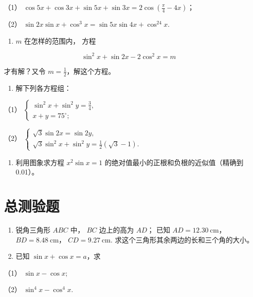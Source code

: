 （1）
\(\cos 5x + \cos 3x + \sin 5x + \sin 3x = 2\cos \left(\frac{\pi}{4} - 4x\right)\)；

（2） \(\sin 2x\sin x + \cos^3 x = \sin 5x\sin 4x + \cos^24x.\)

\begin{enumerate}[start=67]
\item
  \(m\) 在怎样的范围内， 方程
\end{enumerate}

\[
\sin^ {2} x + \sin 2 x - 2 \cos^ {2} x = m
\]

才有解？又令 \(m = \frac{1}{2}\)，解这个方程。

\begin{enumerate}[start=68]
\item
  解下列各方程组：
\end{enumerate}

（1）
\(\left\{ \begin{array}{l} \sin^2 x + \sin^2 y = \frac{3}{4}, \\ x + y = 75^\circ; \end{array} \right.\)

（2）
\(\left\{ \begin{array}{l} \sqrt{3} \sin 2x = \sin 2y, \\ \sqrt{3} \sin^2 x + \sin^2 y = \frac{1}{2} (\sqrt{3} - 1). \end{array} \right.\)

\begin{enumerate}[start=69]
\item
  利用图象求方程 \(x^{2}\sin x = 1\)
  的绝对值最小的正根和负根的近似值（精确到0.01）。
\end{enumerate}

\chapter{总测验题}

\begin{enumerate}
\item
  锐角三角形 \(ABC\) 中， \(BC\) 边上的高为 \(AD\)； 已知
  \(AD = 12.30 \mathrm{~cm}\)， \(BD = 8.48 \mathrm{~cm}\)，
  \(CD = 9.27 \mathrm{~cm}\). 求这个三角形其余两边的长和三个角的大小。
\item
  已知 \(\sin x + \cos x = a\)，求
\end{enumerate}

（1） \(\sin x - \cos x;\)

（2） \(\sin^4 x - \cos^4 x.\)

